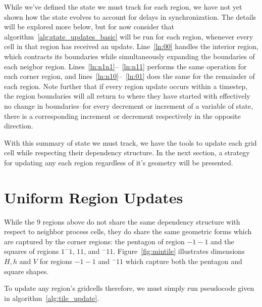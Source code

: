 While we've defined the state we must track for each region,
we have not yet shown how the state evolves to account for delays in synchronization.
The details will be explored more
  below, but for now consider that algorithm~\ref{alg:state_updates_basic} will
 be run for each region, whenever every cell in that region has received an update.
 Line~\ref{ln:00} handles the interior region, which contracts its boundaries
 while simultaneously expanding the boundaries of each neigbor region.
 Lines~\ref{ln:n1n1}--~\ref{ln:n11} performs the same operation for each corner
 region, and lines~\ref{ln:n10}--~\ref{ln:01} does the same for the remainder of
 each region.  Note further that if every region update occurs within a
 timestep, the region boundaries will all return to where they have started with
 effectively no change in boundaries--for every decrement or increment of a
 variable of state, there is a corresponding increment or decrement respectively
 in the opposite direction.

 With this summary of state we must track, we have the
tools to update each grid cell while respecting their dependency structure.
In the next section, a strategy for updating any each region regardless of
it's geometry will be presented.


\section{Uniform Region Updates}

While the 9 regions above do not share the same dependency structure with respect to neighbor process cells,
they do share the same geometric forms which are captured by the corner regions: the pentagon of region
$-1-1$ and the squares of regions $1^-1$, $11$, and $^-11$.  Figure~\ref{fig:mintile} illustrates dimensions
$H,h$ and $V$ for regions $-1-1$ and $^-11$ which capture both the pentagon and square shapes.

To update any
region's gridcells therefore, we must simply run pseudocode given in algorithm~\ref{alg:tile_update}.

